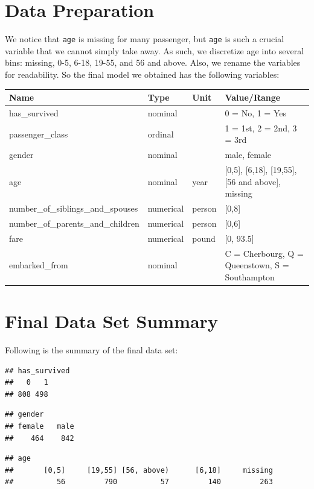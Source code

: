\documentclass[12pt, oneside]{book}
\theoremstyle{definition}
\theoremstyle{definition}
\theoremstyle{definition}
\theoremstyle{remark}
\begin{document}
\hypertarget{data-preparation}{%
\section{Data Preparation}\label{data-preparation}}

We notice that \texttt{age} is missing for many passenger, but
\texttt{age} is such a crucial variable that we cannot simply take away.
As such, we discretize age into several bins: missing, 0-5, 6-18, 19-55,
and 56 and above. Also, we rename the variables for readability. So the
final model we obtained has the following variables:

\begin{tabular}{llll}
\toprule
Name & Type & Unit & Value/Range\\
\midrule
has\_survived & nominal &  & 0 = No, 1 = Yes\\
passenger\_class & ordinal &  & 1 = 1st, 2 = 2nd, 3 = 3rd\\
gender & nominal &  & male, female\\
age & nominal & year & [0,5], [6,18], [19,55], [56 and above], missing\\
number\_of\_siblings\_and\_spouses & numerical & person & [0,8]\\
\addlinespace
number\_of\_parents\_and\_children & numerical & person & [0,6]\\
fare & numerical & pound & [0, 93.5]\\
embarked\_from & nominal &  & C = Cherbourg, Q = Queenstown, S = Southampton\\
\bottomrule
\end{tabular}

\hypertarget{final-data-set-summary}{%
\section{Final Data Set Summary}\label{final-data-set-summary}}

Following is the summary of the final data set:

\begin{verbatim}
## has_survived
##   0   1 
## 808 498
\end{verbatim}

\begin{verbatim}
## gender
## female   male 
##    464    842
\end{verbatim}

\begin{verbatim}
## age
##       [0,5]     [19,55] [56, above)      [6,18]     missing 
##          56         790          57         140         263
\end{verbatim}
\end{document}
